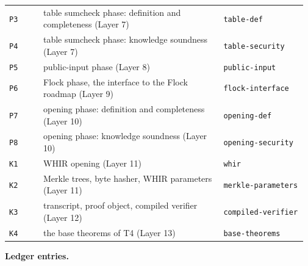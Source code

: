 {\begin{longtable}{@{}>{\raggedright\arraybackslash}p{0.116\linewidth}>{\raggedright\arraybackslash}p{0.582\linewidth}>{\raggedright\arraybackslash}p{0.271\linewidth}@{}}
\texttt{P3} & table sumcheck phase: definition and completeness (Layer 7) & \texttt{table-\allowbreak{}def} \\\addlinespace[2pt]
\texttt{P4} & table sumcheck phase: knowledge soundness (Layer 7) & \texttt{table-\allowbreak{}security} \\\addlinespace[2pt]
\texttt{P5} & public-input phase (Layer 8) & \texttt{public-\allowbreak{}input} \\\addlinespace[2pt]
\texttt{P6} & Flock phase, the interface to the Flock roadmap (Layer 9) & \texttt{flock-\allowbreak{}interface} \\\addlinespace[2pt]
\texttt{P7} & opening phase: definition and completeness (Layer 10) & \texttt{opening-\allowbreak{}def} \\\addlinespace[2pt]
\texttt{P8} & opening phase: knowledge soundness (Layer 10) & \texttt{opening-\allowbreak{}security} \\\addlinespace[2pt]
\texttt{K1} & WHIR opening (Layer 11) & \texttt{whir} \\\addlinespace[2pt]
\texttt{K2} & Merkle trees, byte hasher, WHIR parameters (Layer 11) & \texttt{merkle-\allowbreak{}parameters} \\\addlinespace[2pt]
\texttt{K3} & transcript, proof object, compiled verifier (Layer 12) & \texttt{compiled-\allowbreak{}verifier} \\\addlinespace[2pt]
\texttt{K4} & the base theorems of T4 (Layer 13) & \texttt{base-\allowbreak{}theorems} \\
\end{longtable}}

\textbf{Ledger entries.}

